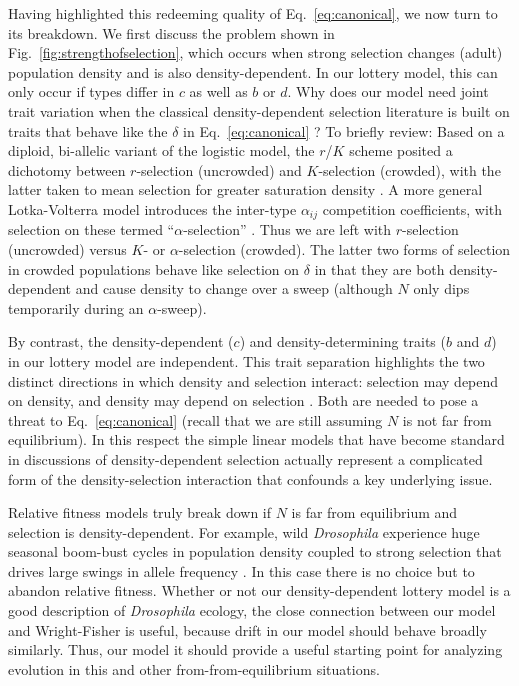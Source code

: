 \documentclass[11pt]{article}
\begin{document}
Having highlighted this redeeming quality of Eq.~\eqref{eq:canonical}, we now turn to its breakdown. We first discuss the problem shown in Fig.~\ref{fig:strengthofselection}, which occurs when strong selection changes (adult) population density and is also density-dependent. In our lottery model, this can only occur if types differ in $c$ as well as $b$ or $d$. Why does our model need joint trait variation when the classical density-dependent selection literature is built on traits that behave like the $\delta$ in Eq.~\eqref{eq:canonical} \citep{christiansen_2004}? To briefly review: Based on a diploid, bi-allelic variant of the logistic model, the $r$/$K$ scheme posited a dichotomy between $r$-selection (uncrowded) and $K$-selection (crowded), with the latter taken to mean selection for greater saturation density \citep{gill_1974}. A more general Lotka-Volterra model introduces the inter-type $\alpha_{ij}$ competition coefficients, with selection on these termed ``$\alpha$-selection'' \citep{gill_1974,joshi_2001}. Thus we are left with $r$-selection (uncrowded) versus $K$- or $\alpha$-selection (crowded). The latter two forms of selection in crowded populations behave like selection on $\delta$ in that they are both density-dependent and cause density to change over a sweep (although $N$ only dips temporarily during an $\alpha$-sweep). 

By contrast, the density-dependent ($c$) and density-determining traits ($b$ and $d$) in our lottery model are independent. This trait separation highlights the two distinct directions in which density and selection interact: selection may depend on density, and density may depend on selection \citep{prout_1976}. Both are needed to pose a threat to Eq.~\eqref{eq:canonical} (recall that we are still assuming $N$ is not far from equilibrium). In this respect the simple linear models that have become standard in discussions of density-dependent selection \citep{roughgarden_1979,christiansen_2004,mallet_2012} actually represent a complicated form of the density-selection interaction that confounds a key underlying issue.

Relative fitness models truly break down if $N$ is far from equilibrium and selection is density-dependent. For example, wild \textit{Drosophila} experience huge seasonal boom-bust cycles in population density coupled to strong selection that drives large swings in allele frequency \citep{bergland_14}. In this case there is no choice but to abandon relative fitness. Whether or not our density-dependent lottery model is a good description of \textit{Drosophila} ecology, the close connection between our model and Wright-Fisher is useful, because drift in our model should behave broadly similarly. Thus, our model it should provide a useful starting point for analyzing evolution in this and other from-from-equilibrium situations.
\end{document}
